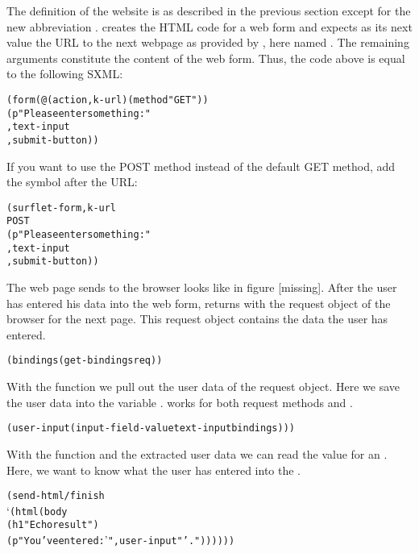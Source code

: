 The definition of the website is as described in the previous section
except for the new abbreviation .
 creates the HTML code for a web form and expects
as its next value the URL to the next webpage as provided by
, here named
.  The remaining arguments constitute the content of the
web form.  Thus, the code above is equal to the following SXML:

\begin{alltt}
(form (@ (action ,k-url) (method "GET"))
  (p "Please enter something:"
     ,text-input
     ,submit-button))
\end{alltt}

If you want to use the POST method instead of the default GET method,
add the symbol  after the URL:

\begin{alltt}
(surflet-form ,k-url
              POST
              (p "Please enter something:"
                 ,text-input
                 ,submit-button))
\end{alltt}

The web page  sends to the browser looks like
in figure [missing]. 
After the user has entered his data into
the web form,  returns with the request object
of the browser for the next page.  This request object contains the
data the user has entered.

\begin{alltt}
             (bindings (get-bindings req))
\end{alltt}

With the function  we pull out the user data of the
request object.  Here we save the user data into the variable
.   works for both request methods
 and .

\begin{alltt}
           (user-input (input-field-value text-input bindings)))
\end{alltt}

With the function  and the extracted user data
we can read the value for an .   Here, we want to
know what the user has entered into the .

\begin{alltt}
        (send-html/finish
         `(html (body
                 (h1 "Echo result")
                 (p "You've entered: '" ,user-input "'."))))))
\end{alltt}

